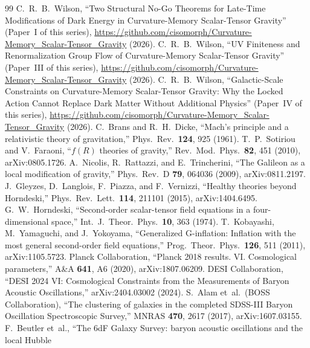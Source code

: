 \documentclass[12pt,a4paper]{article}
\begin{document}
\begin{thebibliography}{99}
  C.~R.~B.~Wilson,
  ``Two Structural No-Go Theorems for Late-Time Modifications of Dark Energy
    in Curvature-Memory Scalar-Tensor Gravity''
  (Paper~I of this series), \url{https://github.com/cisomorph/Curvature-Memory_Scalar-Tensor_Gravity} (2026).
  C.~R.~B.~Wilson,
  ``UV Finiteness and Renormalization Group Flow of Curvature-Memory Scalar-Tensor Gravity''
  (Paper~III of this series), \url{https://github.com/cisomorph/Curvature-Memory_Scalar-Tensor_Gravity} (2026).
  C.~R.~B.~Wilson,
  ``Galactic-Scale Constraints on Curvature-Memory Scalar-Tensor Gravity: Why the Locked Action Cannot Replace Dark Matter Without Additional Physics''
  (Paper~IV of this series), \url{https://github.com/cisomorph/Curvature-Memory_Scalar-Tensor_Gravity} (2026).
  C.~Brans and R.~H.~Dicke,
  ``Mach's principle and a relativistic theory of gravitation,''
  Phys.\ Rev.\ \textbf{124}, 925 (1961).
  T.~P.~Sotiriou and V.~Faraoni,
  ``$f(R)$ theories of gravity,''
  Rev.\ Mod.\ Phys.\ \textbf{82}, 451 (2010), arXiv:0805.1726.
  A.~Nicolis, R.~Rattazzi, and E.~Trincherini,
  ``The Galileon as a local modification of gravity,''
  Phys.\ Rev.\ D \textbf{79}, 064036 (2009), arXiv:0811.2197.
  J.~Gleyzes, D.~Langlois, F.~Piazza, and F.~Vernizzi,
  ``Healthy theories beyond Horndeski,''
  Phys.\ Rev.\ Lett.\ \textbf{114}, 211101 (2015), arXiv:1404.6495.
  G.~W.~Horndeski,
  ``Second-order scalar-tensor field equations in a four-dimensional space,''
  Int.\ J.\ Theor.\ Phys.\ \textbf{10}, 363 (1974).
  T.~Kobayashi, M.~Yamaguchi, and J.~Yokoyama,
  ``Generalized G-inflation: Inflation with the most general second-order
    field equations,''
  Prog.\ Theor.\ Phys.\ \textbf{126}, 511 (2011), arXiv:1105.5723.
  Planck Collaboration,
  ``Planck 2018 results. VI. Cosmological parameters,''
  A\&A \textbf{641}, A6 (2020), arXiv:1807.06209.
  DESI Collaboration,
  ``DESI 2024 VI: Cosmological Constraints from the Measurements of
    Baryon Acoustic Oscillations,''
  arXiv:2404.03002 (2024).
  S.~Alam et~al.\ (BOSS Collaboration),
  ``The clustering of galaxies in the completed SDSS-III Baryon Oscillation
    Spectroscopic Survey,''
  MNRAS \textbf{470}, 2617 (2017), arXiv:1607.03155.
  F.~Beutler et~al.,
  ``The 6dF Galaxy Survey: baryon acoustic oscillations and the local Hubble

\end{thebibliography}
\end{document}
